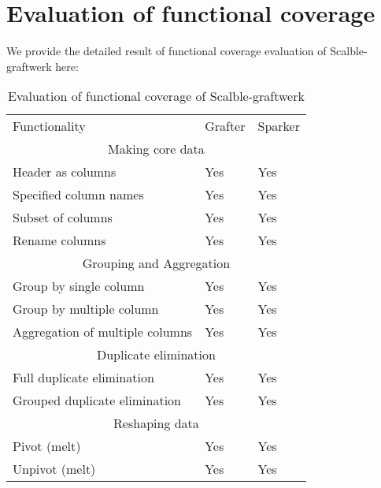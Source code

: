 
\chapter{Evaluation of functional coverage} %

\label{AppendixA} %


We provide the detailed result of functional coverage evaluation of Scalble-graftwerk here:
\begin{table}[]
\centering
\caption{Evaluation of functional coverage of Scalble-graftwerk}
\label{tab:functionalcoverageeval}
\begin{tabular}{lll}
Functionality                           & Grafter & Sparker \\
\multicolumn{3}{c}{{\color[rgb]{0.210,0.175,0.47} Making core data}} \\
Header as columns                       & Yes     & Yes     \\
Specified column names                  & Yes     & Yes     \\
Subset of columns                       & Yes     & Yes     \\
Rename columns                          & Yes     & Yes     \\
\multicolumn{3}{c}{{\color[rgb]{0.210,0.175,0.47} Grouping and Aggregation}} \\
Group by single column                  & Yes     & Yes     \\
Group by multiple column                & Yes     & Yes     \\
Aggregation of multiple columns         & Yes     & Yes     \\
\multicolumn{3}{c}{{\color[rgb]{0.210,0.175,0.47} Duplicate elimination}} \\
Full duplicate elimination              & Yes     & Yes     \\
Grouped duplicate elimination           & Yes     & Yes     \\
\multicolumn{3}{c}{{\color[rgb]{0.210,0.175,0.47} Reshaping data}} \\
Pivot (melt)                            & Yes     & Yes     \\
Unpivot (melt)                          & Yes     & Yes     \\

\end{tabular}
\end{table}

